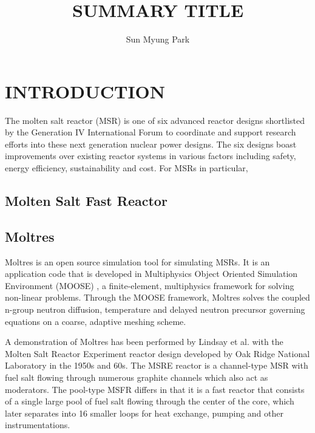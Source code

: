 \documentclass[letterpaper]{mandc2019}
\begin{document}
\title{SUMMARY TITLE}
\author{Sun Myung Park}

\maketitle
\justify

\section{INTRODUCTION}

The molten salt reactor (MSR) is one of six advanced reactor designs shortlisted by the Generation IV International Forum to coordinate and support research efforts into these next generation nuclear power designs. The six designs boast improvements over existing reactor systems in various factors including safety, energy efficiency, sustainability and cost. For MSRs in particular, 

\subsection{Molten Salt Fast Reactor}



\subsection{Moltres}

Moltres is an open source simulation tool for simulating MSRs. It is an application code that is developed in Multiphysics Object Oriented Simulation Environment (MOOSE) \cite{gaston_physics-based_2015}, a finite-element, multiphysics framework for solving non-linear problems. Through the MOOSE framework, Moltres solves the coupled n-group neutron diffusion, temperature and delayed neutron precursor governing equations on a coarse, adaptive meshing scheme.



A demonstration of Moltres has been performed by Lindsay et al. \cite{lindsay_introduction_2018} with the Molten Salt Reactor Experiment reactor design developed by Oak Ridge National Laboratory in the 1950s and 60s. The MSRE reactor is a channel-type MSR with fuel salt flowing through numerous graphite channels which also act as moderators. The pool-type MSFR differs in that it is a fast reactor that consists of a single large pool of fuel salt flowing through the center of the core, which later separates into 16 smaller loops for heat exchange, pumping and other instrumentations. 
\end{document}
